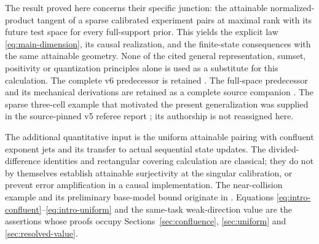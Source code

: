 The result proved here concerns their specific junction: the attainable
normalized-product tangent of a sparse calibrated experiment pairs at
maximal rank with its future test space for every full-support prior.
This yields the explicit law \eqref{eq:main-dimension}, its causal
realization, and the finite-state consequences with the same attainable
geometry. None of the cited general representation, sumset, positivity or
quantization principles alone is used as a substitute for this calculation.
The complete v6 predecessor is retained \cite{A1v6}. The full-space
predecessor and its mechanical derivations are retained
as a complete source companion \cite{A1v5}. The sparse three-cell example
that motivated the present generalization was supplied in the source-pinned
v5 referee report \cite{A1review}; its authorship is not reassigned here.

The additional quantitative input is the uniform attainable pairing with
confluent exponent jets and its transfer to actual sequential state
updates. The divided-difference identities and rectangular covering
calculation are classical; they do not by themselves establish attainable
surjectivity at the singular calibration, or prevent error amplification
in a causal implementation. The near-collision example and its preliminary
base-model bound originate in \cite{A1v6note}. Equations
\eqref{eq:intro-confluent}--\eqref{eq:intro-uniform} and the same-task
weak-direction value are the assertions whose proofs occupy
Sections~\ref{sec:confluence}, \ref{sec:uniform} and
\ref{sec:resolved-value}.
